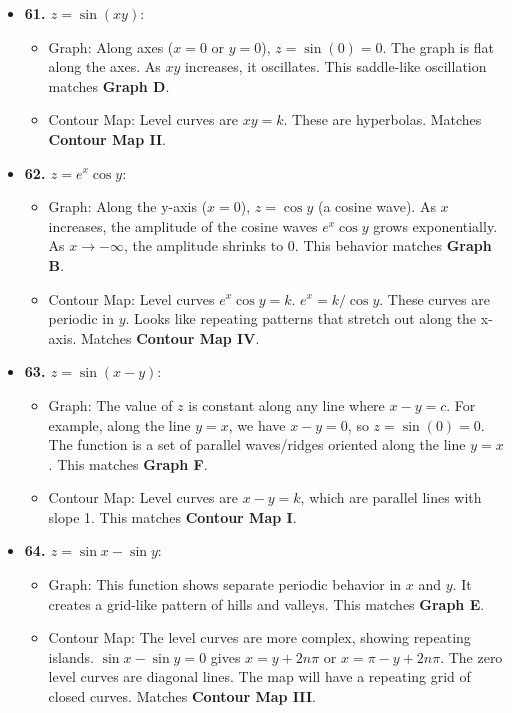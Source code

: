 \documentclass{article}
\begin{document}
\begin{itemize}
    \item \textbf{61. $z = \sin(xy)$}:
    \begin{itemize}
        \item Graph: Along axes ($x=0$ or $y=0$), $z=\sin(0)=0$. The graph is flat along the axes. As $xy$ increases, it oscillates. This saddle-like oscillation matches \textbf{Graph D}.
        \item Contour Map: Level curves are $xy=k$. These are hyperbolas. Matches \textbf{Contour Map II}.
    \end{itemize}
    
    \item \textbf{62. $z = e^x \cos y$}:
    \begin{itemize}
        \item Graph: Along the y-axis ($x=0$), $z=\cos y$ (a cosine wave). As $x$ increases, the amplitude of the cosine waves $e^x \cos y$ grows exponentially. As $x \to -\infty$, the amplitude shrinks to 0. This behavior matches \textbf{Graph B}.
        \item Contour Map: Level curves $e^x \cos y = k$. $e^x = k/\cos y$. These curves are periodic in $y$. Looks like repeating patterns that stretch out along the x-axis. Matches \textbf{Contour Map IV}.
    \end{itemize}
    
    \item \textbf{63. $z = \sin(x-y)$}:
    \begin{itemize}
        \item Graph: The value of $z$ is constant along any line where $x-y=c$. For example, along the line $y=x$, we have $x-y=0$, so $z=\sin(0)=0$. The function is a set of parallel waves/ridges oriented along the line $y=x$. This matches \textbf{Graph F}.
        \item Contour Map: Level curves are $x-y=k$, which are parallel lines with slope 1. This matches \textbf{Contour Map I}.
    \end{itemize}
    
    \item \textbf{64. $z = \sin x - \sin y$}:
    \begin{itemize}
        \item Graph: This function shows separate periodic behavior in $x$ and $y$. It creates a grid-like pattern of hills and valleys. This matches \textbf{Graph E}.
        \item Contour Map: The level curves are more complex, showing repeating islands. $\sin x - \sin y = 0$ gives $x=y+2n\pi$ or $x=\pi-y+2n\pi$. The zero level curves are diagonal lines. The map will have a repeating grid of closed curves. Matches \textbf{Contour Map III}.
    \end{itemize}
    

\end{itemize}
\end{document}
